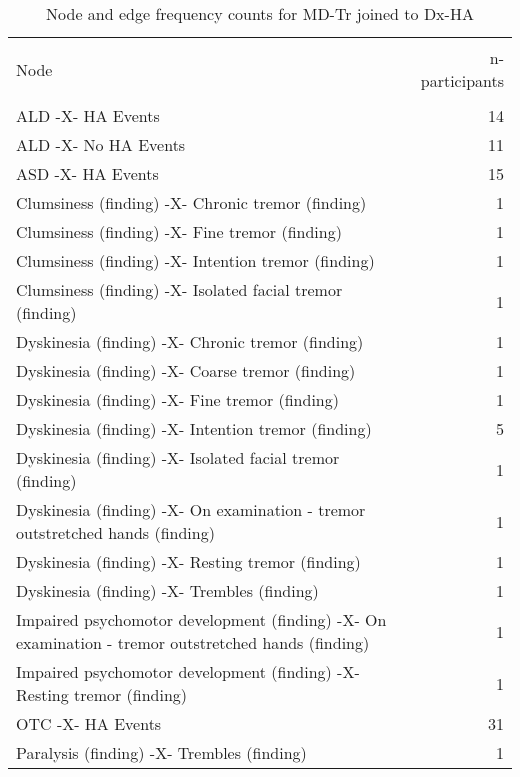 \documentclass[10pt, letterpaper]{article}
\begin{document}
\begin{spacing}{1.0}
\begin{small}
    \begin{longtable}[H]{p{5in}r}
        \caption{Node and edge frequency counts for MD-Tr joined to Dx-HA}\\
        \hline\\[-8pt]
        Node & n-participants\\
        \hline\\[-6pt]
        ALD -X- HA Events & 14 \\
        \rowcolor{ltBlue}
        ALD -X- No HA Events & 11 \\
        ASD -X- HA Events & 15 \\
        \rowcolor{ltBlue}
        Clumsiness (finding) -X- Chronic tremor (finding) & 1 \\
        Clumsiness (finding) -X- Fine tremor (finding) & 1 \\
        \rowcolor{ltBlue}
        Clumsiness (finding) -X- Intention tremor (finding) & 1 \\
        Clumsiness (finding) -X- Isolated facial tremor (finding) & 1 \\
        \rowcolor{ltBlue}
        Dyskinesia (finding) -X- Chronic tremor (finding) & 1 \\
        Dyskinesia (finding) -X- Coarse tremor (finding) & 1 \\
        \rowcolor{ltBlue}
        Dyskinesia (finding) -X- Fine tremor (finding) & 1 \\
        Dyskinesia (finding) -X- Intention tremor (finding) & 5 \\
        \rowcolor{ltBlue}
        Dyskinesia (finding) -X- Isolated facial tremor (finding) & 1 \\
        Dyskinesia (finding) -X- On examination - tremor outstretched hands (finding) & 1 \\
        \rowcolor{ltBlue}
        Dyskinesia (finding) -X- Resting tremor (finding) & 1 \\
        Dyskinesia (finding) -X- Trembles (finding) & 1 \\
        \rowcolor{ltBlue}
        Impaired psychomotor development (finding) -X- On examination - tremor outstretched hands (finding) & 1 \\
        Impaired psychomotor development (finding) -X- Resting tremor (finding) & 1 \\
        \rowcolor{ltBlue}
        OTC -X- HA Events & 31 \\
        Paralysis (finding) -X- Trembles (finding) & 1 \\

\end{longtable}
\end{small}
\end{spacing}
\end{document}
